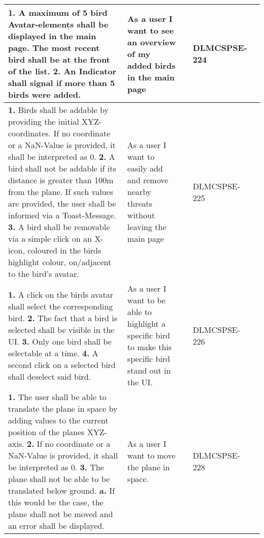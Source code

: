 \begin{xltabular}{\textwidth}{|X|X|M{1.8cm}|M{1.3cm}|M{1.3cm}|}
\hline 
 \endlastfoot 
\textbf{1.} A maximum of 5 bird Avatar-elements shall be displayed in the main page. The most recent bird shall be at the front of the list. \newline \textbf{2.} An Indicator shall signal if more than 5 birds were added. & As a user I want to see an overview of my added birds in the main page &  & {\color{purpleT}\ttfamily DLMCSPSE-224} &  \\ \hline 
  \textbf{1.} Birds shall be addable by providing the initial XYZ-coordinates. If no coordinate or a NaN-Value is provided, it shall be interpreted as 0. \newline \textbf{2.} A bird shall not be addable if its distance is greater than 100m from the plane. If such values are provided, the user shall be informed via a Toast-Message. \newline \textbf{3.} A bird shall be removable via a simple click on an X-icon, coloured in the birds highlight colour, on/adjacent to the bird’s avatar. & As a user I want to easily add and remove nearby threats without leaving the main page &  & {\color{purpleT}\ttfamily DLMCSPSE-225} &  \\ \hline 
  \textbf{1.} A click on the birds avatar shall select the corresponding bird. \newline \textbf{2.} The fact that a bird is selected shall be visible in the UI. \newline \textbf{3.} Only one bird shall be selectable at a time. \newline \textbf{4.} A second click on a selected bird shall deselect said bird. \newline & As a user I want to be able to highlight a specific bird to make this specific bird stand out in the UI. &  & {\color{purpleT}\ttfamily DLMCSPSE-226} &  \\ \hline 
  \textbf{1.} The user shall be able to translate the plane in space by adding values to the current position of the planes XYZ-axis. \newline \newline \textbf{2.} If no coordinate or a NaN-Value is provided, it shall be interpreted as 0. \newline \newline \textbf{3.} The plane shall not be able to be translated below ground. \newline \textbf{a.}  If this would be the case, the plane shall not be moved and an error shall be displayed. & As a user I want to move the plane in space. &  & {\color{purpleT}\ttfamily DLMCSPSE-228} &  \\ \hline 

\end{xltabular}
